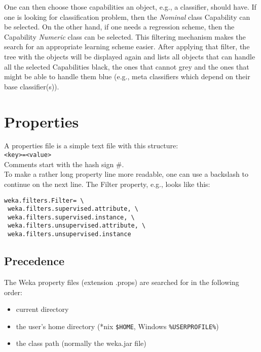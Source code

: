 \begin{center}
\end{center}

\noindent One can then choose those capabilities an object, e.g., a
classifier, should have. If one is looking for classification problem,
then the \textit{Nominal} class Capability can be selected. On the other hand,
if one needs a regression scheme, then the Capability \textit{Numeric} class
can be selected. This filtering mechanism makes the search for an
appropriate learning scheme easier. After applying that filter, the
tree with the objects will be displayed again and lists all objects
that can handle all the selected Capabilities black, the ones that
cannot grey and the ones that might be able to handle them blue (e.g.,
meta classifiers which depend on their base classifier(s)).

\newpage
\section{Properties}
A properties file is a simple text file with this structure:\\

\verb^<key>=<value>^\\

\noindent Comments start with the hash sign \#.\\

\noindent To make a rather long property line more readable, one can
use a backslash to continue on the next line. The Filter property,
e.g., looks like this:

\begin{verbatim}
weka.filters.Filter= \
 weka.filters.supervised.attribute, \
 weka.filters.supervised.instance, \
 weka.filters.unsupervised.attribute, \
 weka.filters.unsupervised.instance
\end{verbatim}

\subsection{Precedence}
The Weka property files (extension .props) are searched for in the following order:

\begin{itemize}
\item current directory
\item the user's home directory (*nix \verb=$HOME=, Windows \verb=%USERPROFILE%=)
\item the class path (normally the weka.jar file) 
\end{itemize}

